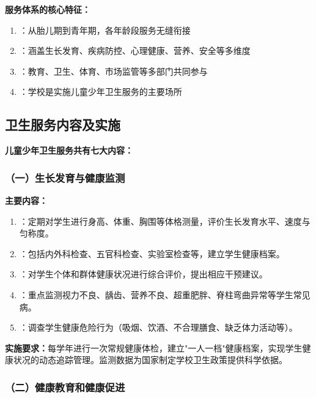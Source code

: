 \begin{defbox}
\textbf{服务体系的核心特征：}
\begin{enumerate}[leftmargin=*]
    \item {}：从胎儿期到青年期，各年龄段服务无缝衔接
    \item {}：涵盖生长发育、疾病防控、心理健康、营养、安全等多维度
    \item {}：教育、卫生、体育、市场监管等多部门共同参与
    \item {}：学校是实施儿童少年卫生服务的主要场所
\end{enumerate}
\end{defbox}

\subsection{卫生服务内容及实施}

\begin{keybox}
\textbf{儿童少年卫生服务共有七大内容：}
\end{keybox}

\subsubsection{（一）生长发育与健康监测}

\begin{defbox}
\textbf{主要内容：}
\begin{enumerate}[leftmargin=*]
    \item {}：定期对学生进行身高、体重、胸围等体格测量，评价生长发育水平、速度与匀称度。
    \item {}：包括内外科检查、五官科检查、实验室检查等，建立学生健康档案。
    \item {}：对学生个体和群体健康状况进行综合评价，提出相应干预建议。
    \item {}：重点监测视力不良、龋齿、营养不良、超重肥胖、脊柱弯曲异常等学生常见病。
    \item {}：调查学生健康危险行为（吸烟、饮酒、不合理膳食、缺乏体力活动等）。
\end{enumerate}

\textbf{实施要求：}每学年进行一次常规健康体检，建立"一人一档"健康档案，实现学生健康状况的动态追踪管理。监测数据为国家制定学校卫生政策提供科学依据。
\end{defbox}

\subsubsection{（二）健康教育和健康促进}

